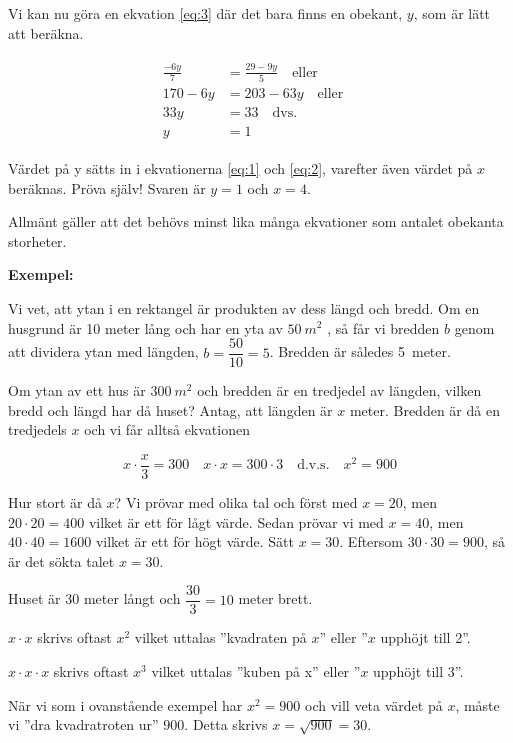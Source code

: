 Vi kan nu göra en ekvation \ref{eq:3} där det bara finns en obekant, \(y\),
som är lätt att beräkna.

\begin{align}
  \begin{split}
    \label{eq:3}
    \frac{ - 6y}{7} &= \frac{29 - 9y}{5}
    \quad \text{eller} \\
    170 - 6y &= 203-63y
    \quad \text{eller} \quad \\
    33y &= 33
    \quad \text{dvs.} \quad \\
    y &= 1
  \end{split}
\end{align}

Värdet på y sätts in i ekvationerna \ref{eq:1} och \ref{eq:2}, varefter även
värdet på \(x\) beräknas.
Pröva själv! Svaren är \(y = 1\) och \(x = 4\).

Allmänt gäller att det behövs minst lika många ekvationer som antalet obekanta
storheter.

\textbf{Exempel:}

Vi vet, att ytan i en rektangel är produkten av dess längd och bredd.
Om en husgrund är 10 meter lång och har en yta av \(50\ m^2\) , så får vi bredden
\(b\) genom att dividera ytan med längden, \(b = \dfrac{50}{10} = 5\).
Bredden är således 5~meter.

Om ytan av ett hus är \(300\ m^2\) och bredden är en tredjedel av längden, vilken
bredd och längd har då huset?
Antag, att längden är \(x\) meter.
Bredden är då en tredjedels \(x\) och vi får alltså ekvationen

\[
x \cdot \frac{x}{3} = 300 \quad
x \cdot x = 300 \cdot 3 \quad \text{d.v.s.}
\quad x^2 = 900
\]

Hur stort är då \(x\)?
Vi prövar med olika tal och först med \(x = 20\), men \(20 \cdot 20 = 400\)
vilket är ett för lågt värde.
Sedan prövar vi med \(x = 40\), men \(40 \cdot 40 = 1600\) vilket är ett för
högt värde.
Sätt \(x = 30\). Eftersom \(30 \cdot 30 = 900\), så är det sökta talet
\(x = 30\).

Huset är 30 meter långt och \(\dfrac{30}{3} = 10\) meter brett.

\(x \cdot x\) skrivs oftast \(x^2\) vilket uttalas ''kvadraten på \(x\)''
eller ''\(x\) upphöjt till 2''.

\(x \cdot x \cdot x\) skrivs oftast \(x^3\) vilket uttalas ''kuben på x''
eller ''\(x\) upphöjt till 3''.

När vi som i ovanstående exempel har \(x^2 = 900\) och vill veta värdet på
\(x\), måste vi ''dra kvadratroten ur'' \(900\).
Detta skrivs \(x = \sqrt{900} = 30\).

